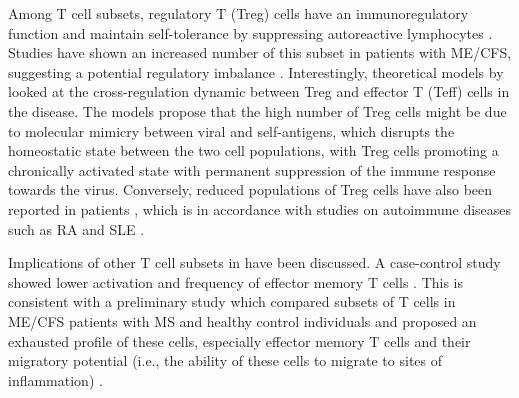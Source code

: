 Among T cell subsets, regulatory \cdfour T (Treg) cells have an immunoregulatory function and maintain self-tolerance by suppressing autoreactive lymphocytes \citep{janeway2017Immunology}.
Studies have shown an increased number of this subset in patients with ME/CFS, suggesting a potential regulatory imbalance \citep{curriu2013ScreeningNK, brenu2014RoleAdaptive, ramosRegulatoryNaturalKiller2016}.
Interestingly, theoretical models by \citet{sepulveda2019MyalgicEncephalomyelitis} looked at the cross-regulation dynamic between Treg and effector T (Teff) cells in the disease. 
The models propose that the high number of Treg cells might be due to molecular mimicry between viral and self-antigens, which disrupts the homeostatic state between the two cell populations, with Treg cells promoting a chronically activated state with permanent suppression of the immune response towards the virus.
Conversely, reduced populations of Treg cells have also been reported in \cfs patients \citep{rivasAssociationNKCell2018}, which is in accordance with studies on autoimmune diseases such as RA \citep{yan2022RegulatoryCells} and SLE \citep{barreto2009LowFrequency}.

Implications of other T cell subsets in \cfs have been discussed.
A case-control study showed lower activation and frequency of effector memory T cells \citep{curriu2013ScreeningNK}.
This is consistent with a preliminary study which compared subsets of \cdeight T cells in ME/CFS patients with MS and healthy control individuals and proposed an exhausted profile of these cells, especially effector memory \cdeight T cells and their migratory potential (i.e., the ability of these cells to migrate to sites of inflammation) \citep{brenu2016PreliminaryComparative}.


